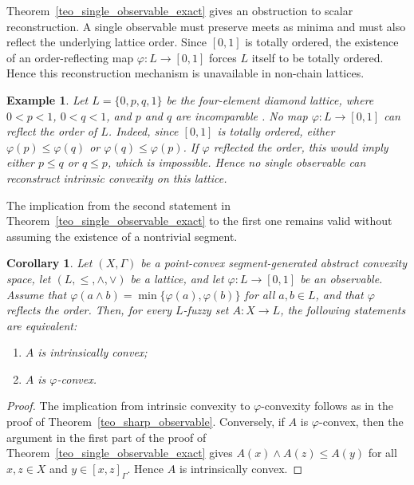 \documentclass[11pt,a4paper]{article}
\newtheorem{example}{Example}
\newtheorem{corollary}{Corollary}
\begin{document}
Theorem~\ref{teo_single_observable_exact} gives an obstruction to scalar reconstruction. A single observable must preserve meets as minima and must also reflect the underlying lattice order. Since \([0,1]\) is totally ordered, the existence of an order-reflecting map \(\varphi:L\to[0,1]\) forces \(L\) itself to be totally ordered. Hence this reconstruction mechanism is unavailable in non-chain lattices.

\begin{example}\label{ex4}
Let \(L=\{0,p,q,1\}\) be the four-element diamond lattice, where \(0<p<1\), \(0<q<1\), and \(p\) and \(q\) are incomparable \citep{Gratzer2011}. No map \(\varphi:L\to[0,1]\) can reflect the order of \(L\). Indeed, since \([0,1]\) is totally ordered, either \(\varphi(p)\le\varphi(q)\) or \(\varphi(q)\le\varphi(p)\). If \(\varphi\) reflected the order, this would imply either \(p\le q\) or \(q\le p\), which is impossible. Hence no single observable can reconstruct intrinsic convexity on this lattice.
\end{example}






The implication from the second statement in Theorem~\ref{teo_single_observable_exact} to the first one remains valid without assuming the existence of a nontrivial segment.

\begin{corollary}\label{corolario_single_observable}
Let \((X,\Gamma)\) be a point-convex segment-generated abstract convexity space, let \((L,\leq,\wedge,\vee)\) be a lattice, and let \(\varphi:L\to[0,1]\) be an observable. Assume that \(\varphi(a\wedge b)=\min\{\varphi(a),\varphi(b)\}\) for all \(a,b\in L\), and that \(\varphi\) reflects the order. Then, for every \(L\)-fuzzy set \(A:X\to L\), the following statements are equivalent:
\begin{enumerate}
    \item \(A\) is intrinsically convex;
    \item \(A\) is \(\varphi\)-convex.
\end{enumerate}
\end{corollary}

\begin{proof}
The implication from intrinsic convexity to \(\varphi\)-convexity follows as in the proof of Theorem~\ref{teo_sharp_observable}. Conversely, if \(A\) is \(\varphi\)-convex, then the argument in the first part of the proof of Theorem~\ref{teo_single_observable_exact} gives \(A(x)\wedge A(z)\le A(y)\) for all \(x,z\in X\) and \(y\in[x,z]_{\Gamma}\). Hence \(A\) is intrinsically convex.
\end{proof}
\end{document}
